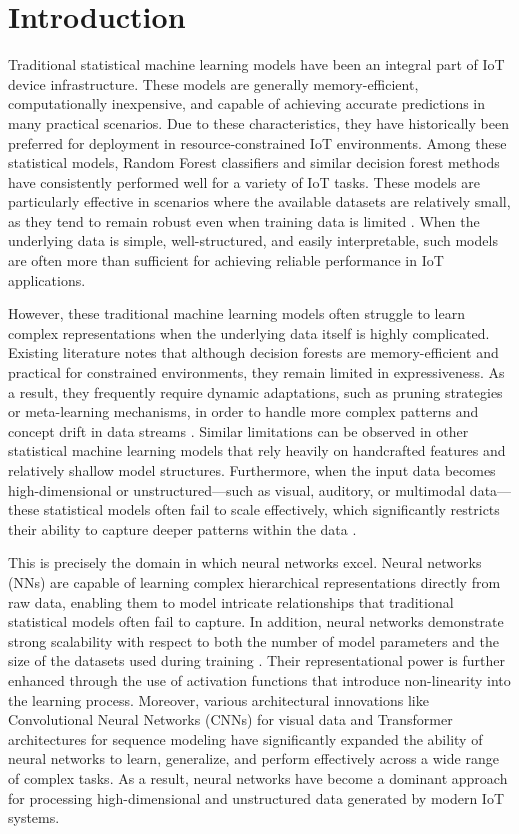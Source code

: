 \documentclass[conference]{IEEEtran}
\begin{document}
	\section{Introduction}
	
	Traditional statistical machine learning models have been an integral part of IoT device infrastructure. These models are generally memory-efficient, computationally inexpensive, and capable of achieving accurate predictions in many practical scenarios. Due to these characteristics, they have historically been preferred for deployment in resource-constrained IoT environments. Among these statistical models, Random Forest classifiers and similar decision forest methods have consistently performed well for a variety of IoT tasks. These models are particularly effective in scenarios where the available datasets are relatively small, as they tend to remain robust even when training data is limited \cite{meidan2017, sliwa2024}. When the underlying data is simple, well-structured, and easily interpretable, such models are often more than sufficient for achieving reliable performance in IoT applications.
	
	However, these traditional machine learning models often struggle to learn complex representations when the underlying data itself is highly complicated. Existing literature notes that although decision forests are memory-efficient and practical for constrained environments, they remain limited in expressiveness. As a result, they frequently require dynamic adaptations, such as pruning strategies or meta-learning mechanisms, in order to handle more complex patterns and concept drift in data streams \cite{lourenco2025}. Similar limitations can be observed in other statistical machine learning models that rely heavily on handcrafted features and relatively shallow model structures. Furthermore, when the input data becomes high-dimensional or unstructured—such as visual, auditory, or multimodal data—these statistical models often fail to scale effectively, which significantly restricts their ability to capture deeper patterns within the data \cite{zhou2024}.
	
	This is precisely the domain in which neural networks excel. Neural networks (NNs) are capable of learning complex hierarchical representations directly from raw data, enabling them to model intricate relationships that traditional statistical models often fail to capture. In addition, neural networks demonstrate strong scalability with respect to both the number of model parameters and the size of the datasets used during training \cite{hestness2017}. Their representational power is further enhanced through the use of activation functions that introduce non-linearity into the learning process. Moreover, various architectural innovations like Convolutional Neural Networks (CNNs) for visual data \cite{lecun1998} and Transformer architectures for sequence modeling \cite{vaswani2017} have significantly expanded the ability of neural networks to learn, generalize, and perform effectively across a wide range of complex tasks. As a result, neural networks have become a dominant approach for processing high-dimensional and unstructured data generated by modern IoT systems.
	
\end{document}
